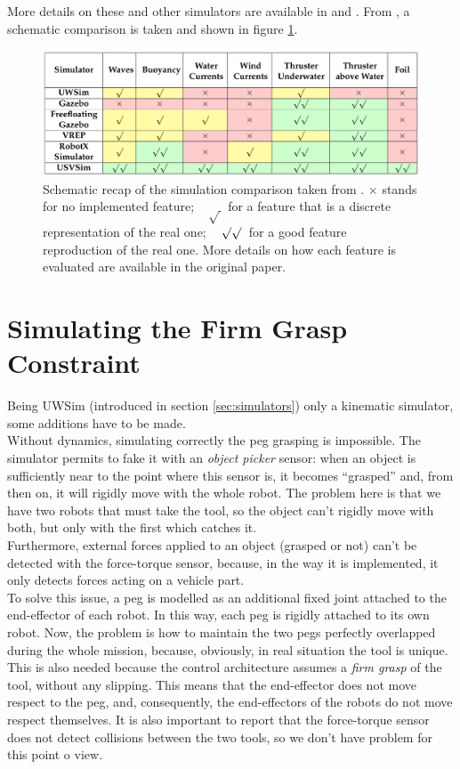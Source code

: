 More details on these and other simulators are available in \cite{simComparisonCook} and \cite{usvsim}. From \cite{usvsim}, a schematic comparison is taken and shown in figure \ref{fig:simComparison}.
\begin{figure}[H]
	\centering
	\includegraphics[width=14cm]{simComparison.png}
	\caption[Table of Simulators Comparison]{Schematic recap of the simulation comparison taken from \cite{usvsim}. $\times$ stands for no implemented feature; ~ $\surd\,$  for a feature that is a discrete representation of the real one; ~ $\surd\surd\,$ for a good feature reproduction of the real one. More details on how each feature is evaluated are available in the original paper.}
	\label{fig:simComparison}
\end{figure}


\section{Simulating the Firm Grasp Constraint}
\label{sec:firmGrasp}
Being UWSim (introduced in section \ref{sec:simulators}) only a kinematic simulator, some additions have to be made.\\
Without dynamics, simulating correctly the peg grasping is impossible. The simulator permits to fake it with an \textit{object picker} sensor: when an object is sufficiently near to the point where this sensor is, it becomes \enquote{grasped} and, from then on, it will rigidly move with the whole robot. The problem here is that we have two robots that must take the tool, so the object can't rigidly move with both, but only with the first which catches it. \\
Furthermore, external forces applied to an object (grasped or not) can't be detected with the force-torque sensor, because, in the way it is implemented, it only detects forces acting on a vehicle part.\\

To solve this issue, a peg is modelled as an additional fixed joint attached to the end-effector of each robot. In this way, each peg is rigidly attached to its own robot. Now, the problem is how to maintain the two pegs perfectly overlapped during the whole mission, because, obviously, in real situation the tool is unique. This is also needed because the control architecture assumes a \textit{firm grasp} of the tool, without any slipping. This means that the end-effector does not move respect to the peg, and, consequently, the end-effectors of the robots do not move respect themselves. It is also important to report that the force-torque sensor does not detect collisions between the two tools, so we don't have problem for this point o view.\\

